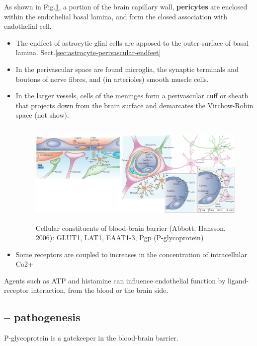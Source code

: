 As shown in Fig.\ref{fig:blood-brain-barrier-2}, a portion of the brain
capillary wall, {\bf pericytes} are enclosed within the endothelial basal
lamina, and form the closed association with endothelial cell.
\begin{itemize}
  \item  The endfeet of astrocytic glial cells are apposed to the outer surface of basal
lamina. Sect.\ref{sec:astrocyte-perivascular-endfeet}

  \item In the perivascular space are found microglia, the synaptic terminals and
boutons of nerve fibres, and (in arterioles) smooth muscle cells.

  \item In the larger vessels, cells of the meninges form a perivascular cuff or
  sheath that projects down from the brain surface and demarcates the
  Virchow-Robin space (not show).

\begin{figure}[hbt]
  \centerline{\includegraphics[height=5cm,
    angle=0]{./images/blood-brain-barrier-2.eps}}
\caption{Cellular constituents of blood-brain barrier (Abbott, Hansson, 2006):
GLUT1, LAT1, EAAT1-3, Pgp (P-glycoprotein)}
\label{fig:blood-brain-barrier-2}
\end{figure}

  \item Some receptors are coupled to increases in the concentration of
  intracellular Ca2+

\end{itemize}

Agents such as ATP and histamine can influence endothelial function by
ligand-receptor interaction, from the blood or the brain side.

 \subsection{-- pathogenesis}

P-glycoprotein is a gatekeeper in the blood-brain barrier.

